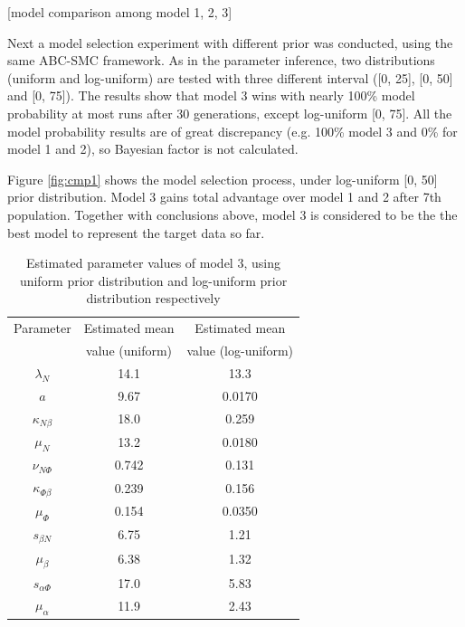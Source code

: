 \documentclass[12pt,a4paper]{report}
\begin{document}
[model comparison among model 1, 2, 3]

Next a model selection experiment with different prior was conducted, using the same ABC-SMC framework. As in the parameter inference, two distributions (uniform and log-uniform) are tested with three different interval ([0, 25], [0, 50] and [0, 75]). The results show that model 3 wins with nearly 100\% model probability at most runs after 30 generations, except log-uniform [0, 75]. All the model probability results are of great discrepancy (e.g. 100\% model 3 and 0\% for model 1 and 2), so Bayesian factor is not calculated. 

Figure \ref{fig:cmp1} shows the model selection process, under log-uniform [0, 50] prior distribution. Model 3 gains total advantage over model 1 and 2 after 7th population. Together with conclusions above, model 3 is considered to be the the best model to represent the target data so far.
 


\begin{table}[t!]
    \centering
    \begin{tabular}{|c c c|} 
     \hline
     Parameter & Estimated mean  & Estimated mean  \\ 
      & value (uniform) &value (log-uniform) \\[0.5ex] 
     \hline\hline
     $\lambda_N$ & 14.1 & 13.3 \\ 
     $a$ & 9.67 & 0.0170  \\ 
     $\kappa_{N\beta}$ & 18.0 & 0.259 \\
     $\mu_N$ & 13.2 & 0.0180 \\
     $\nu_{N\Phi}$ & 0.742 & 0.131 \\
     \hline
     $\kappa_{\Phi\beta}$ & 0.239 & 0.156 \\
     $\mu_\Phi$ & 0.154 & 0.0350 \\
     \hline
     $s_{\beta N}$ & 6.75 & 1.21 \\
     $\mu_\beta$ & 6.38 & 1.32 \\
     \hline
     $s_{\alpha\Phi}$ & 17.0 & 5.83 \\
     $\mu_\alpha$ & 11.9 & 2.43\\
     \hline
    \end{tabular}
    \caption[Estimated parameter values of model 3]
    {Estimated parameter values of model 3, using uniform prior distribution and log-uniform prior distribution respectively}
    \label{table:estimated1}
\end{table}
\end{document}
